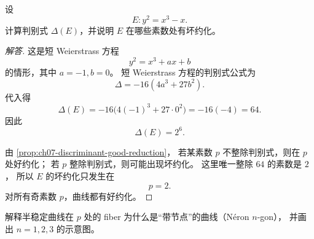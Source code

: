 \begin{exercise}
\label{ex:ch07-good-reduction-discriminant}
设
\[
  E:y^2=x^3-x.
\]
计算判别式 $\Delta(E)$，并说明 $E$ 在哪些素数处有坏约化。
\end{exercise}

\begin{proof}[解答]
这是短 Weierstrass 方程
\[
  y^2=x^3+ax+b
\]
的情形，其中 $a=-1,b=0$。
短 Weierstrass 方程的判别式公式为
\[
  \Delta=-16(4a^3+27b^2).
\]
代入得
\[
  \Delta(E)=-16\bigl(4(-1)^3+27\cdot 0^2\bigr)
  =-16(-4)=64.
\]
因此
\[
  \Delta(E)=2^6.
\]

由 \cref{prop:ch07-discriminant-good-reduction}，
若某素数 $p$ 不整除判别式，则在 $p$ 处好约化；
若 $p$ 整除判别式，则可能出现坏约化。
这里唯一整除 $64$ 的素数是 $2$，
所以 $E$ 的坏约化只发生在
\[
  p=2.
\]
对所有奇素数 $p$，曲线都有好约化。
\end{proof}

\begin{exercise}
\label{ex:ch07-neron-ngon}
解释半稳定曲线在 $p$ 处的 fiber 为什么是“带节点”的曲线（N\'eron $n$-gon），
并画出 $n=1,2,3$ 的示意图。
\end{exercise}

